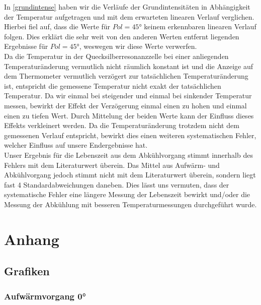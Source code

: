 \documentclass[12pt]{article}
\begin{document}
In \ref{grundintense} haben wir die Verläufe der Grundintensitäten in Abhängigkeit der Temperatur aufgetragen und mit dem erwarteten linearen Verlauf verglichen. Hierbei fiel auf, dass die Werte für $Pol=45°$ keinem erkennbaren linearen Verlauf folgen. Dies erklärt die sehr weit von den anderen Werten entfernt liegenden Ergebnisse für $Pol=45°$, weswegen wir diese Werte verwerfen.\\

Da die Temperatur in der Quecksilberresonanzzelle bei einer anliegenden Temperaturänderung vermutlich nicht räumlich konstant ist und die Anzeige auf dem Thermometer vermutlich verzögert zur tatsächlichen Temperaturänderung ist, entspricht die gemessene Temperatur nicht exakt der tatsächlichen Temperatur. Da wir einmal bei steigender und einmal bei sinkender Temperatur messen, bewirkt der Effekt der Verzögerung einmal einen zu hohen und einmal einen zu tiefen Wert. Durch Mittelung der beiden Werte kann der Einfluss dieses Effekts verkleinert werden. Da die Temperaturänderung trotzdem nicht dem gemessenen Verlauf entspricht, bewirkt dies einen weiteren systematischen Fehler, welcher Einfluss auf unsere Endergebnisse hat.\\

Unser Ergebnis für die Lebenszeit aus dem Abkühlvorgang stimmt innerhalb des Fehlers mit dem Literaturwert überein. Das Mittel aus Aufwärm- und Abkühlvorgang jedoch stimmt nicht mit dem Literaturwert überein, sondern liegt fast 4 Standardabweichungen daneben. Dies lässt uns vermuten, dass der systematische Fehler eine längere Messung der Lebenszeit bewirkt und/oder die Messung der Abkühlung mit besseren Temperaturmessungen durchgeführt wurde.
\section{Anhang}

\subsection{Grafiken}\label{bilder}
\subsubsection{Aufwärmvorgang 0°}
\end{document}
